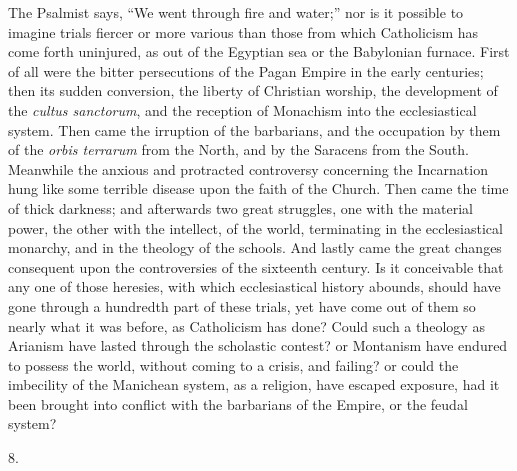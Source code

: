 The Psalmist says, ``We went through fire and water;'' nor
is it possible to imagine trials fiercer or more various than those
from which Catholicism has come forth uninjured, as out of the
Egyptian sea or the Babylonian furnace. First of all were the bitter
persecutions of the Pagan Empire in the early centuries; then its
sudden conversion, the liberty of Christian worship, the development
of the \emph{cultus sanctorum}, and the reception of Monachism into
the ecclesiastical system. Then came the irruption of the barbarians,
and the occupation by them of the \emph{orbis terrarum} from the
North, and by the Saracens from the South. Meanwhile the anxious and
protracted controversy concerning the Incarnation hung like some
terrible disease upon the faith of the Church. Then came the time of
thick darkness; and afterwards two great struggles, one with the
material power, the other with the intellect, of the world,
terminating in the ecclesiastical monarchy, and in the theology of the
schools. And lastly came the great changes consequent upon the
controversies of the sixteenth century. Is it conceivable that any one
of those heresies, with which ecclesiastical history abounds, should
have gone through a hundredth part of these trials, yet have come out
of them so nearly what it was before, as Catholicism has done? Could
such a theology as Arianism have lasted through the scholastic
contest? or Montanism have endured to possess the world, without
coming to a crisis, and failing? or could the imbecility of the
Manichean system, as a religion, have escaped exposure, had it been
brought into conflict with the barbarians of the Empire, or the feudal
system?

8.

